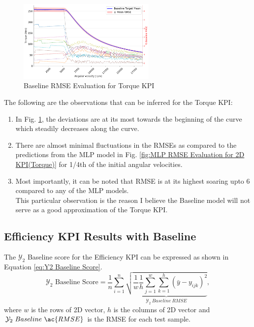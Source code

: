 \documentclass{report} %
\begin{document}
\begin{figure}[H]
    \centering
    \includegraphics[width=0.6\textwidth]{./ReportImages/RMSE_Baseline_y1.png} 
    \caption{Baseline \ac{RMSE} Evaluation for Torque \ac{KPI}} 
    \label{fig:Baseline RMSE Evaluation for 2D KPI(Torque)}
\end{figure}

The following are the observations that can be inferred for the Torque \ac{KPI}:
\begin{enumerate}[nosep]
    
    \item In Fig. \ref{fig:Baseline RMSE Evaluation for 2D KPI(Torque)}, the deviations are at its most towards the beginning of the curve which steadily decreases along the curve.
    \item There are almost minimal fluctuations in the \ac{RMSE}s as compared to the predictions from the \ac{MLP} model in 
    Fig. \ref{fig:MLP RMSE Evaluation for 2D KPI(Torque)} for 1/4th of the initial angular velocities.
    \item Most importantly, it can be noted that \ac{RMSE} is at its highest soaring upto 6 compared to any of the \ac{MLP} models.\\
    This particular observation is the reason I believe the Baseline model will not serve as a good approximation of the Torque \ac{KPI}.\\
\end{enumerate}

\subsection{Efficiency KPI Results with Baseline}\label{subsec:Efficiency KPI Results with Baseline}

The $\mathcal{Y}_2$ Baseline score for the Efficiency \ac{KPI} can be expressed as shown in Equation \ref{eq:Y2 Baseline Score}.
\begin{equation}
    \text{$\mathcal{Y}_2$ Baseline Score} = \frac{1}{n} \sum_{i=1}^{n} \underbrace{ \sqrt{\frac{1}{w} \frac{1}{h} \sum_{j=1}^{w} \sum_{k=1}^{h} (\bar{y} - y_{ijk})^2}}_{\mathcal{Y}_2\ Baseline\ RMSE},
    \label{eq:Y2 Baseline Score}
\end{equation}
where \(w\) is the rows of 2\ac{D} vector, \(h\) is the columns of 2\ac{D} vector and \(\mathcal{Y}_2\ Baseline\ \ac{RMSE}\) is the \ac{RMSE} for each test sample.\\
\end{document}
